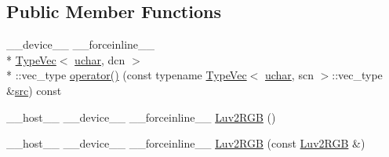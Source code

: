 \subsection*{Public Member Functions}
\begin{DoxyCompactItemize}
\item 
\-\_\-\-\_\-device\-\_\-\-\_\- \-\_\-\-\_\-forceinline\-\_\-\-\_\- \\*
\hyperlink{structcv_1_1gpu_1_1device_1_1TypeVec}{Type\-Vec}$<$ \hyperlink{core_2types__c_8h_a65f85814a8290f9797005d3b28e7e5fc}{uchar}, dcn $>$\\*
\-::vec\-\_\-type \hyperlink{structcv_1_1gpu_1_1device_1_1color__detail_1_1Luv2RGB_3_01uchar_00_01scn_00_01dcn_00_01srgb_00_01blueIdx_01_4_a3c120cdaff67279307bedaa87cbcf7f9}{operator()} (const typename \hyperlink{structcv_1_1gpu_1_1device_1_1TypeVec}{Type\-Vec}$<$ \hyperlink{core_2types__c_8h_a65f85814a8290f9797005d3b28e7e5fc}{uchar}, scn $>$\-::vec\-\_\-type \&\hyperlink{legacy_8hpp_a371cd109b74033bc4366f584edd3dacc}{src}) const 
\item 
\-\_\-\-\_\-host\-\_\-\-\_\- \-\_\-\-\_\-device\-\_\-\-\_\- \-\_\-\-\_\-forceinline\-\_\-\-\_\- \hyperlink{structcv_1_1gpu_1_1device_1_1color__detail_1_1Luv2RGB_3_01uchar_00_01scn_00_01dcn_00_01srgb_00_01blueIdx_01_4_a72c851df167dfebc0dc35168ad454704}{Luv2\-R\-G\-B} ()
\item 
\-\_\-\-\_\-host\-\_\-\-\_\- \-\_\-\-\_\-device\-\_\-\-\_\- \-\_\-\-\_\-forceinline\-\_\-\-\_\- \hyperlink{structcv_1_1gpu_1_1device_1_1color__detail_1_1Luv2RGB_3_01uchar_00_01scn_00_01dcn_00_01srgb_00_01blueIdx_01_4_a10d58a9ae1d08359dafb44f90ae78595}{Luv2\-R\-G\-B} (const \hyperlink{structcv_1_1gpu_1_1device_1_1color__detail_1_1Luv2RGB}{Luv2\-R\-G\-B} \&)
\end{DoxyCompactItemize}


